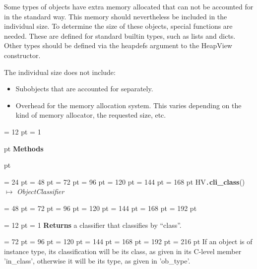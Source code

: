 {{{Some types of objects have extra memory allocated that can not be
accounted for in the standard way. This memory should nevertheless be
included in the individual size. To determine the size of these
objects, special functions are needed. These are defined for standard
builtin types, such as lists and dicts. Other types should be defined
via the heapdefs argument to the HeapView constructor.
 \par}
{\par 
 The individual size does not include: \par}
\begin{itemize}
\item  Subobjects that are accounted for separately.\item  Overhead for the memory allocation system. This varies depending
  on the kind of memory allocator, the requested size, etc.
\end{itemize}
\par}
{\par \pagebreak[3.300000] \noindent \hangindent = 12 pt \hangafter = 1 
{\par \pagebreak[3]  pt \noindent
{\Large {\bf Methods\/}}\par {} pt
} \noindent
\par}
{\par \noindent  \leftskip = 24 pt  \leftmargini = 48 pt  \leftmarginii = 72 pt  \leftmarginiii = 96 pt  \leftmarginiv = 120 pt  \leftmarginv = 144 pt  \leftmarginvi = 168 pt HV{\tt .\/}{\bf {\large {\bf cli{\_}class\/}}\/}() \(\mapsto \)  {\em ObjectClassifier\/}{\par \noindent
{\par \noindent  \leftskip = 48 pt  \leftmargini = 72 pt  \leftmarginii = 96 pt  \leftmarginiii = 120 pt  \leftmarginiv = 144 pt  \leftmarginv = 168 pt  \leftmarginvi = 192 pt {\par \noindent
{\par \pagebreak[3.100000] \noindent \hangindent = 12 pt \hangafter = 1 
{\bf Returns \/} a classifier that classifies by ``class''.\par}
{\par \noindent  \leftskip = 72 pt  \leftmargini = 96 pt  \leftmarginii = 120 pt  \leftmarginiii = 144 pt  \leftmarginiv = 168 pt  \leftmarginv = 192 pt  \leftmarginvi = 216 pt 
If an object is of instance type, its classification will be its
class, as given in its C-level member 'in{\_}class', otherwise it will
be its type, as given in 'ob{\_}type'.\par}
}}}}}
